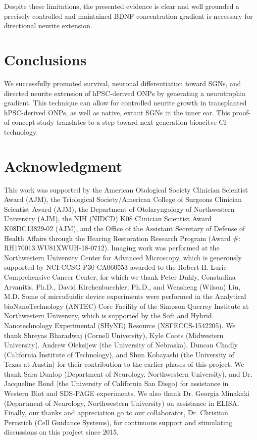 \documentclass[review]{elsarticle}
\begin{document}
\indent Despite these limitations, the presented evidence is clear and well grounded \textendash a precisely controlled and maintained BDNF concentration gradient is necessary for directional neurite extension.

\section* {Conclusions}
We successfully promoted survival, neuronal differentiation toward SGNs, and directed neurite extension of hPSC-derived ONPs by generating a neurotrophin gradient. This technique can allow for controlled neurite growth in transplanted hPSC-derived ONPs, as well as native, extant SGNs in the inner ear. This proof-of-concept study translates to a step toward next-generation bioacitve CI technology. 

\section* {Acknowledgment}	
This work was supported by the American Otological Society Clinician Scientist Award (AJM), the Triological Society/American College of Surgeons Clinician Scientist Award (AJM), the Department of Otolaryngology of Northwestern University (AJM), the NIH (NIDCD) K08 Clinician Scientist Award K08DC13829-02 (AJM), and the Office of the Assistant Secretary of Defense of Health Affairs through the Hearing Restoration Research Program (Award \#: RH170013:WU81XWUH-18-0712). Imaging work was performed at the Northwestern University Center for Advanced Microscopy, which is generously supported by NCI CCSG P30 CA060553 awarded to the Robert H. Lurie Comprehensive Cancer Center, for which we thank Peter Duhly, Constadina Arvanitis, Ph.D., David Kirchenbuechler, Ph.D., and Wensheng (Wilson) Liu, M.D.  Some of microfluidic device experiments were performed in the Analytical bioNanoTechnology (ANTEC) Core Facility of the Simpson Querrey Institute at Northwestern University, which is supported by the Soft and Hybrid Nanotechnology Experimental (SHyNE) Resource (NSFECCS-1542205). We thank Shreyas Bharadwaj (Cornell University), Kyle Coots (Midwestern University), Andrew Oleksijew (the University of Nebraska), Duncan Chadly (California Institute of Technology), and Shun Kobayashi (the University of Texas at Austin) for their contribution to the earlier phases of this project. We thank Sara Dunlop (Department of Neurology, Northwestern University), and Dr. Jacqueline Bond (the University of California San Diego) for assistance in Western Blot and SDS-PAGE experiments. We also thank Dr. Georgia Minakaki (Department of Neurology, Northwestern University) on assistance in ELISA. Finally, our thanks and appreciation go to our collaborator, Dr. Christian Pernstich (Cell Guidance Systems), for continuous support and stimulating discussions on this project since 2015. 
\end{document}
